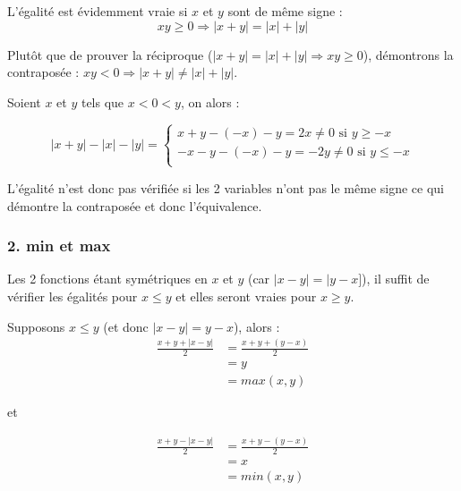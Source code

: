 \documentclass{report}
\begin{document}
L'égalité est évidemment vraie si $x$ et $y$ sont de même signe :
\begin{displaymath}
	xy \geq 0 \Longrightarrow |x+y| = |x| + |y|
\end{displaymath}

Plutôt que de prouver la réciproque ($|x+y| = |x| + |y| \Longrightarrow xy \geq 0$), démontrons
la contraposée : $xy < 0 \Longrightarrow |x+y| \neq |x| + |y|$.

Soient $x$ et $y$ tels que $ x < 0 < y$, on alors :

\begin{displaymath}
		|x+y| - |x| - |y|
		= \begin{cases}
			x+y-(-x)-y = 2x \neq 0 \text { si } y \geq -x \\
			-x-y-(-x)-y = -2y \neq 0 \text { si } y \leq -x \\
		\end{cases}
\end{displaymath}

L'égalité n'est donc pas vérifiée si les 2 variables n'ont pas le même signe ce qui démontre la contraposée
et donc l'équivalence.

\subsubsection*{2. min et max}

Les 2 fonctions étant symétriques en $x$ et $y$ (car $|x-y| = |y-x]$), il suffit de vérifier les égalités
pour $x \leq y$ et elles seront vraies pour $x \geq y$.

Supposons $x \leq y$ (et donc $|x-y|=y-x$), alors :
\begin{equation*}
	\begin{split}
		\frac{x + y + |x-y|}{2} &= \frac{x + y + (y-x)}{2} \\
		                        &= y \\
		                        &= max(x,y)
	\end{split}
\end{equation*}

et

\begin{equation*}
	\begin{split}
		\frac{x + y - |x-y|}{2} &= \frac{x + y - (y-x)}{2} \\
		&= x \\
		&= min(x,y)
	\end{split}
\end{equation*}
\end{document}
